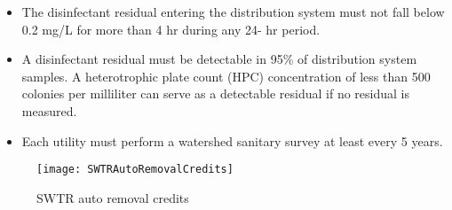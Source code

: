 \begin{itemize}
\item The disinfectant residual entering the distribution system must not fall below 0.2 mg/L for more than 4 hr during any 24- hr period.

\item A disinfectant residual must be detectable in 95\% of distribution system samples. A heterotrophic plate count (HPC)  concentration of less than 500 colonies per milliliter can serve as a detectable residual if no residual is measured.

\item Each utility must perform a watershed sanitary survey at least every 5 years.

\end{itemize}
\begin{figure}[H]
\begin{center}
\texttt{[image: SWTRAutoRemovalCredits]}
\caption{SWTR auto removal credits}
\end{center}
\end{figure}


\nopagebreak


